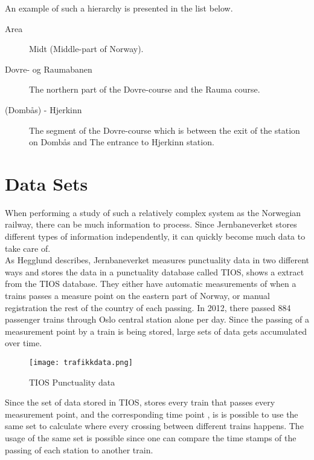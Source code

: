 \bigskip
An example of such a hierarchy is presented in the list below.

\begin{description}
	\item [Area] Midt (Middle-part of Norway).
	\item [Dovre- og Raumabanen] The northern part of the Dovre-course and the
	Rauma course.
	\item [(Dombås) - Hjerkinn] The segment of the Dovre-course which is 
	between the exit of the station on Dombås and The entrance to Hjerkinn
	station.
\end{description}


\clearpage
\section{Data Sets} %
\label{sec:back_data_sets}
When performing a study of such a relatively complex system as the
Norwegian railway, there can be much information to process. Since 
Jernbaneverket stores different types of information independently, it can 
quickly become much data to take care of.\\

As Hegglund\cite[pp. 10-11]{hegglundPunklighetsdataIJernbanetraffik} describes,
Jernbaneverket measures punctuality data in two different ways and stores the
data in a punctuality database called TIOS,  shows a extract from the TIOS database. They either have automatic measurements of when a 
trains passes a measure point on the eastern part of Norway, or manual 
registration the rest of the country of each passing. In 2012, there 
passed 884 passenger trains through Oslo central station alone per day\cite[p. 12]{jernbaneverketStatistikk}.
Since the passing of a measurement point by a train is being stored, large sets
of data gets accumulated over time.

\begin{figure}[!htbp]
	\texttt{[image: trafikkdata.png]}
	\caption[TIOS Punctuality data]{TIOS Punctuality data \cite{sintefPresis}}
	\label{fig:jernbaneverket-trafikkdata}
\end{figure}
\pagebreak

Since the set of data stored in TIOS, stores every train that passes every 
measurement point, and the corresponding time point , is is possible
to use the same set to calculate where every crossing between different trains
happens. The usage of the same set is possible since one can compare the time 
stamps of the passing of each station to another train.\\

